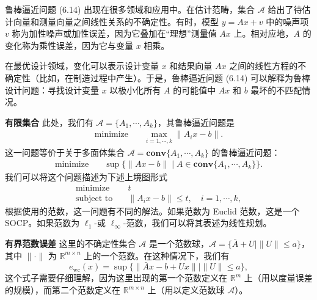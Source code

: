 \documentclass[UTF8, 12pt, fontset=fandol, oneside]{ctexart}
\begin{document}
鲁棒逼近问题 (6.14) 出现在很多领域和应用中。在估计范畴，集合 $\mathcal{A}$ 给出了待估计向量和测量向量之间线性关系的不确定性。有时，模型 $y=Ax+v$ 中的噪声项 $v$ 称为加性噪声或加性误差，因为它叠加在“理想”测量值 $Ax$ 上。相对应地，$A$ 的变化称为乘性误差，因为它与变量 $x$ 相乘。

在最优设计领域，变化可以表示设计变量 $x$ 和结果向量 $Ax$ 之间的线性方程的不确定性（比如，在制造过程中产生）。于是，鲁棒逼近问题 (6.14) 可以解释为鲁棒设计问题：寻找设计变量 $x$ 以极小化所有 $A$ 的可能值中 $Ax$ 和 $b$ 最坏的不匹配情况。

\noindent\textbf{有限集合}\quad
此处，我们有 $\mathcal{A}=\{A_1,\cdots,A_k\}$，其鲁棒逼近问题是
\[
\begin{aligned}
\text{minimize}\quad & \max_{i=1,\cdots,k}\|A_ix-b\|.
\end{aligned}
\]
这一问题等价于关于多面体集合 $\mathcal{A}=\mathbf{conv}\{A_1,\cdots,A_k\}$ 的鲁棒逼近问题：
\[
\begin{aligned}
\text{minimize}\quad & \sup\{\|Ax-b\|\mid A\in\mathbf{conv}\{A_1,\cdots,A_k\}\}.
\end{aligned}
\]
我们可以将这个问题描述为下述上境图形式
\[
\begin{aligned}
\text{minimize}\quad & t\\
\text{subject to}\quad & \|A_ix-b\|\leq t,\quad i=1,\cdots,k,
\end{aligned}
\]
根据使用的范数，这一问题有不同的解法。如果范数为 Euclid 范数，这是一个 SOCP。如果范数为 $\ell_1$-或 $\ell_\infty$-范数，我们可以将其表述为线性规划。

\noindent\textbf{有界范数误差}\quad
这里的不确定性集合 $\mathcal{A}$ 是一个范数球，$\mathcal{A}=\{\bar{A}+U\mid \|U\|\leq a\}$，其中 $\|\cdot\|$ 为 $\mathbb{R}^{m\times n}$ 上的一个范数。在这种情况下，我们有
\[
e_{\mathrm{wc}}(x)=\sup\{\|\bar{A}x-b+Ux\|\mid \|U\|\leq a\},
\]
这个式子需要仔细理解，因为这里出现的第一个范数定义在 $\mathbb{R}^m$ 上（用以度量误差的规模），而第二个范数定义在 $\mathbb{R}^{m\times n}$ 上（用以定义范数球 $\mathcal{A}$）。
\end{document}
